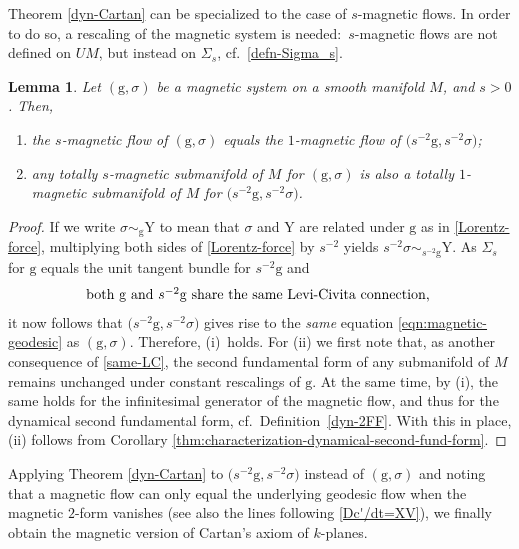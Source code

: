 \documentclass[10pt,a4paper]{amsart}
\newcommand{\g}{\mathrm{g}}
\newcommand{\Y}{\mathrm{Y}}
\numberwithin{equation}{section}
\newtheorem{Lemma}[Theorem]{Lemma}
\theoremstyle{definition}
\begin{document}
Theorem \ref{dyn-Cartan} can be specialized to the case of $s$-magnetic flows. In order to do so, a rescaling of the magnetic system is needed:\ $s$-magnetic flows are not defined on $UM$, but instead on $\Sigma_s$, cf.\ \eqref{defn-Sigma_s}.

\begin{Lemma} \label{lem:reduction}
Let $(\g,\sigma)$ be a magnetic system on a smooth manifold $M$, and $s>0$. Then,
\begin{enumerate}[\normalfont(i)]\itemsep=0pt
 \item the $s$-magnetic flow of $(\g,\sigma)$ equals the $1$-magnetic flow of $\bigl(s^{-2}\g,s^{-2}\sigma\bigr)$;
 \item any totally $s$-magnetic submanifold of $M$ for $(\g,\sigma)$ is also a totally \mbox{$1$-mag\-ne\-tic} submanifold of $M$ for $\bigl(s^{-2}\g,s^{-2}\sigma\bigr)$.
\end{enumerate}
\end{Lemma}

 \begin{proof}
 If we write $\sigma \sim_{\g} \Y$ to mean that $\sigma$ and $\Y$ are related under $\g$ as in \eqref{Lorentz-force}, multiplying both sides of \eqref{Lorentz-force} by $s^{-2}$ yields $s^{-2}\sigma \sim_{s^{-2}\g} \Y$. As $\Sigma_s$ for $\g$ equals the unit tangent bundle for $s^{-2}\g$ and \begin{equation}\label{same-LC} \parbox{.72\textwidth}{both $\g$ and $s^{-2}\g$ share the same Levi-Civita connection,}\end{equation} it now follows that $\bigl(s^{-2}\g,s^{-2}\sigma\bigr)$ gives rise to the \emph{same} equation \eqref{eqn:magnetic-geodesic} as $(\g,\sigma)$. Therefore, (i)~holds. For (ii) we first note that, as another consequence of \eqref{same-LC}, the second fundamental form of any submanifold of $M$ remains unchanged under constant rescalings of $\g$. At the same time, by (i), the same holds for the infinitesimal generator of the magnetic flow, and thus for the dynamical second fundamental form, cf.\ Definition~\ref{dyn-2FF}. With this in place, (ii) follows from Corollary \ref{thm:characterization-dynamical-second-fund-form}.
 \end{proof}

Applying Theorem \ref{dyn-Cartan} to $\bigl(s^{-2}\g,s^{-2}\sigma\bigr)$ instead of $(\g,\sigma)$ and noting that a magnetic flow can only equal the underlying geodesic flow when the magnetic $2$-form vanishes (see also the lines following \eqref{Dc'/dt=XV}), we finally obtain the magnetic version of Cartan's axiom of $k$-planes.
\end{document}
